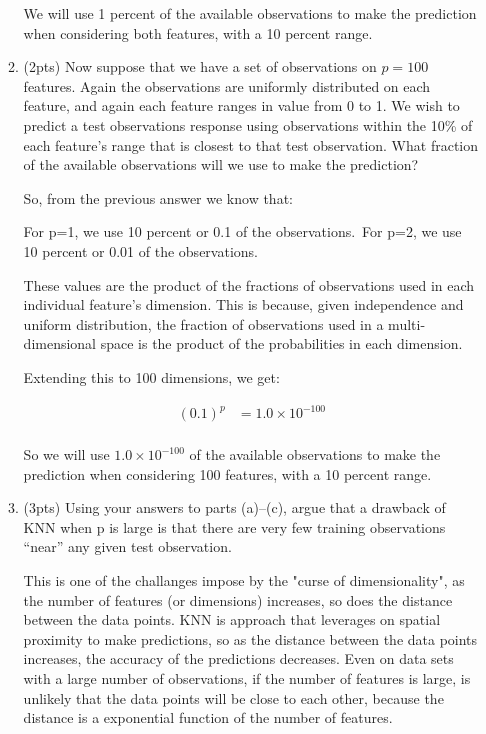 \documentclass[a4paper]{article}
\theoremstyle{definition}
\newenvironment{soln}{
    \leavevmode\color{blue}\ignorespaces
}{}
\begin{document}
\begin{enumerate}
\begin{enumerate}
\begin{soln}
		We will use 1 percent of the available observations to make the prediction when considering both features, with a 10 percent range. \end{soln}
	
	\item (2pts) Now suppose that we have a set of observations on $p = 100$ features. Again the observations are uniformly distributed on each feature, and again each feature ranges in value from 0 to 1. We wish to predict a test observations response using observations within the 10\% of each feature’s range that is closest to that test observation. What fraction of the available observations will we use to make the prediction?
	
	\begin{soln}  So, from the previous answer we know that:

		For p=1, we use 10 percent or 0.1 of the observations.\
		For p=2, we use 10 percent or 0.01 of the observations.\
		
		These values are the product of the fractions of observations used in each individual feature's dimension. This is because, given independence and uniform distribution, the fraction of observations used in a multi-dimensional space is the product of the probabilities in each dimension.
		
		Extending this to 100 dimensions, we get:
		
		$$
		\begin{align}
		(0.1)^{p} &= 1.0 \times 10^{-100} \\
		\end{align}
		$$
		
		So we will use $1.0 \times 10^{-100}$ of the available observations to make the prediction when considering 100 features, with a 10 percent range. \end{soln}
	
	\item (3pts) Using your answers to parts (a)–(c), argue that a drawback of KNN when p is large is that there are very few training observations “near” any given test observation.
	
	\begin{soln}  This is one of the challanges impose by the "curse of dimensionality", as the number of features (or dimensions) increases, so does the distance between the data points. KNN is approach that leverages on spatial proximity to make predictions, so as the distance between the data points increases, the accuracy of the predictions decreases. Even on data sets with a large number of observations, if the number of features is large, is unlikely that the data points will be close to each other, because the distance is a exponential function of the number of features. \end{soln}
	

\end{enumerate}
\end{enumerate}
\end{document}
